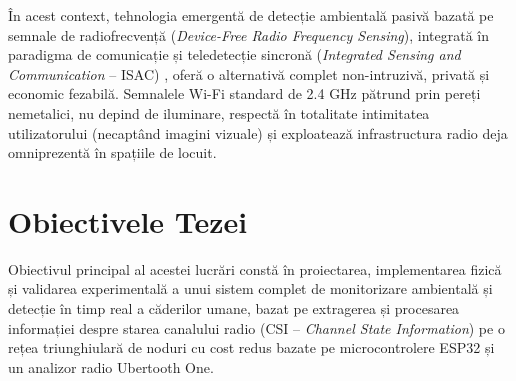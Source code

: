 În acest context, tehnologia emergentă de detecție ambientală pasivă bazată pe semnale de radiofrecvență (\textit{Device-Free Radio Frequency Sensing}), integrată în paradigma de comunicație și teledetecție sincronă (\textit{Integrated Sensing and Communication} -- ISAC) \cite{yang2022integrated}, oferă o alternativă complet non-intruzivă, privată și economic fezabilă. Semnalele Wi-Fi standard de 2.4 GHz pătrund prin pereți nemetalici, nu depind de iluminare, respectă în totalitate intimitatea utilizatorului (necaptând imagini vizuale) și exploatează infrastructura radio deja omniprezentă în spațiile de locuit.

\section{Obiectivele Tezei}
Obiectivul principal al acestei lucrări constă în proiectarea, implementarea fizică și validarea experimentală a unui sistem complet de monitorizare ambientală și detecție în timp real a căderilor umane, bazat pe extragerea și procesarea informației despre starea canalului radio (CSI -- \textit{Channel State Information}) pe o rețea triunghiulară de noduri cu cost redus bazate pe microcontrolere ESP32 și un analizor radio Ubertooth One.

